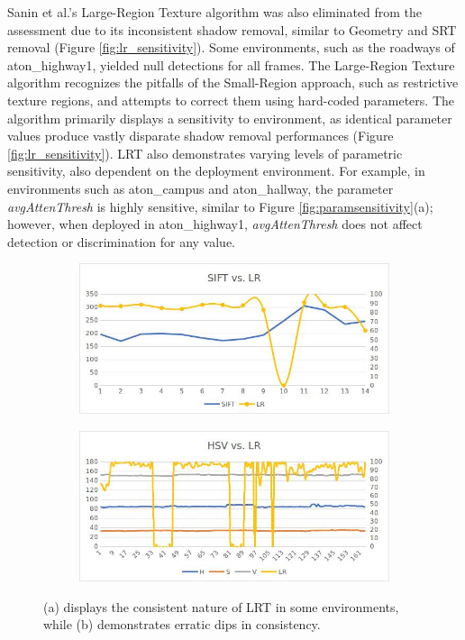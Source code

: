 Sanin et al.'s Large-Region Texture algorithm was also eliminated from the assessment due to its inconsistent shadow removal, similar to Geometry and SRT removal (Figure \ref{fig:lr_sensitivity}). Some environments, such as the roadways of aton\_highway1, yielded null detections for all frames. The Large-Region Texture algorithm recognizes the pitfalls of the Small-Region approach, such as restrictive texture regions, and attempts to correct them using hard-coded parameters. The algorithm primarily displays a sensitivity to environment, as identical parameter values produce vastly disparate shadow removal performances (Figure \ref{fig:lr_sensitivity}). LRT also demonstrates varying levels of parametric sensitivity, also dependent on the deployment environment. For example, in environments such as aton\_campus and aton\_hallway, the parameter \textit{avgAttenThresh} is highly sensitive, similar to Figure \ref{fig:paramsensitivity}(a); however, when deployed in aton\_highway1, \textit{avgAttenThresh} does not affect detection or discrimination for any value.

\begin{figure}
\centering
\begin{subfigure}{.8\linewidth}
  \centering
  \includegraphics[width=1\linewidth]{figures/lrt_sensitivity_2.jpg}
  \caption{}
\end{subfigure}
\hfill
\begin{subfigure}{.8\linewidth}
  \centering
  \includegraphics[width=1\linewidth]{figures/lrt_sensitivity_1.jpg}
  \caption{}
\end{subfigure}
\caption{(a) displays the consistent nature of LRT in some environments, while (b) demonstrates erratic dips in consistency.}
\label{fig:lrt_sensitivity}
\end{figure}


